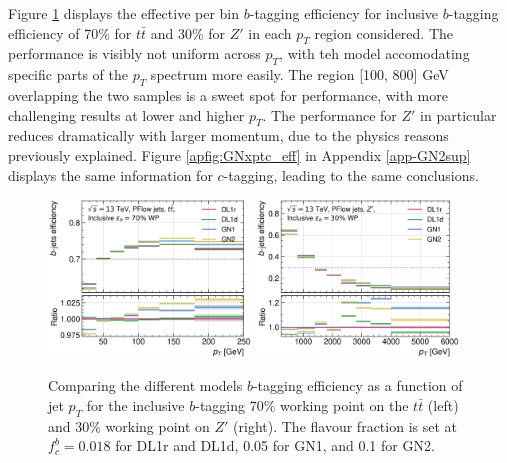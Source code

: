 Figure \ref{fig:GNxptb_eff} displays the effective per bin $b$-tagging efficiency for inclusive $b$-tagging efficiency of 70\% for $t\bar{t}$ and 30\% for $Z'$ in each $p_T$ region considered. The performance is visibly not uniform across $p_T$, with teh model accomodating specific parts of the $p_T$ spectrum more easily. The region [100, 800] GeV overlapping the two samples is a sweet spot for performance, with more challenging results at lower and higher $p_T$. The performance for $Z'$ in particular reduces dramatically with larger momentum, due to the physics reasons previously explained. Figure \ref{apfig:GNxptc_eff} in Appendix \ref{app-GN2sup} displays the same information for $c$-tagging, leading to the same conclusions. 
\begin{figure}[h!]
  \centering
  \includegraphics[width=0.48\textwidth]{Images/FTAG/GN/GN2/pt_plots/pt_ttbar_b_eff.png}
  \includegraphics[width=0.48\textwidth]{Images/FTAG/GN/GN2/pt_plots/pt_zp_b_eff.png}
  \caption{Comparing the different models $b$-tagging efficiency as a function of jet $p_T$ for the inclusive $b$-tagging 70\% working point on the $t\bar{t}$ (left) and 30\% working point on $Z'$ (right). The flavour fraction is set at $f^b_c = 0.018$ for DL1r and DL1d, 0.05 for GN1, and 0.1 for GN2.}
  \label{fig:GNxptb_eff}
\end{figure} 

